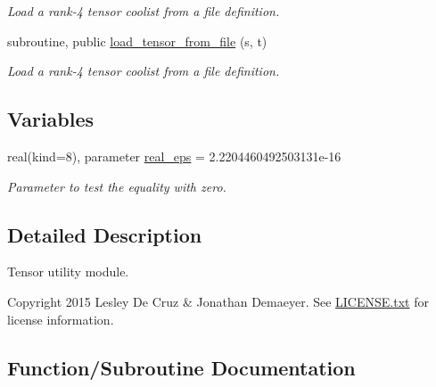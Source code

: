 \begin{DoxyCompactItemize}
\begin{DoxyCompactList}\small\item\em Load a rank-\/4 tensor coolist from a file definition. \end{DoxyCompactList}\item 
subroutine, public \hyperlink{namespacetensor_ac4c6ebce7aee73aebac2514e45f7cc78}{load\+\_\+tensor\+\_\+from\+\_\+file} (s, t)
\begin{DoxyCompactList}\small\item\em Load a rank-\/4 tensor coolist from a file definition. \end{DoxyCompactList}\end{DoxyCompactItemize}
\subsection*{Variables}
\begin{DoxyCompactItemize}
\item 
real(kind=8), parameter \hyperlink{namespacetensor_a2a2ab182d86107e62533c3f0043652cc}{real\+\_\+eps} = 2.\+2204460492503131e-\/16
\begin{DoxyCompactList}\small\item\em Parameter to test the equality with zero. \end{DoxyCompactList}\end{DoxyCompactItemize}


\subsection{Detailed Description}
Tensor utility module. 

\begin{DoxyCopyright}{Copyright}
2015 Lesley De Cruz \& Jonathan Demaeyer. See \hyperlink{LICENSE_8txt}{L\+I\+C\+E\+N\+S\+E.\+txt} for license information. 
\end{DoxyCopyright}


\subsection{Function/\+Subroutine Documentation}
